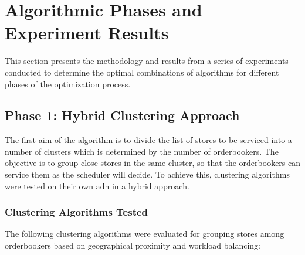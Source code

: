 \section{Algorithmic Phases and Experiment Results}

This section presents the methodology and results from a series of experiments conducted to determine the optimal combinations of algorithms for different phases of the optimization process.




\subsection{Phase 1: Hybrid Clustering Approach}
The first aim of the algorithm is to divide the list of stores to be serviced into a number of clusters which is determined by the number of orderbookers.
The objective is to group close stores in the same cluster, so that the orderbookers can service them as the scheduler will decide.
To achieve this, clustering algorithms were tested on their own adn in a hybrid approach.

\subsubsection{Clustering Algorithms Tested}

The following clustering algorithms were evaluated for grouping stores among orderbookers based on geographical proximity and workload balancing:

